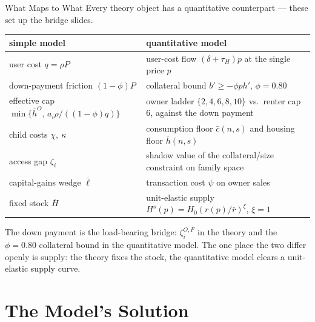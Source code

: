 \documentclass[aspectratio=169,10pt]{beamer}
\providecommand{\1}{\mathbf 1}
\begin{document}
\begin{frame}{What Maps to What}
  Every theory object has a quantitative counterpart --- these set up the bridge slides.
  \begin{center}
  \renewcommand{\arraystretch}{1.25}
  \begin{tabularx}{0.92\textwidth}{>{\raggedright\arraybackslash}p{}>{\raggedright\arraybackslash}X}
  \toprule
  simple model & quantitative model\\
  \midrule
  user cost $q=\rho P$ & user-cost flow $(\delta+\tau_H)p$ at the single price $p$\\
  down-payment friction $(1-\phi)P$ & collateral bound $b'\ge-\phi p h'$, $\phi=0.80$\\
  effective cap $\min\{\bar h^O,\,a_i\rho/((1-\phi)q)\}$ & owner ladder $\{2,4,6,8,10\}$ vs.\ renter cap $6$, against the down payment\\
  child costs $\chi,\ \kappa$ & consumption floor $\bar c(n,s)$ and housing floor $\bar h(n,s)$\\
  access gap $\zeta_i$ & shadow value of the collateral/size constraint on family space\\
  capital-gains wedge $\bar\ell$ & transaction cost $\psi$ on owner sales\\
  fixed stock $\bar H$ & unit-elastic supply $H^s(p)=H_0(r(p)/\bar r)^{\xi}$, $\xi=1$\\
  \bottomrule
  \end{tabularx}
  \end{center}
  The down payment is the load-bearing bridge: $\zeta_i^{O,F}$ in the theory and the $\phi=0.80$ collateral bound in the quantitative model. The one place the two differ openly is supply: the theory fixes the stock, the quantitative model clears a unit-elastic supply curve.
\end{frame}

\section{The Model's Solution}
\end{document}
